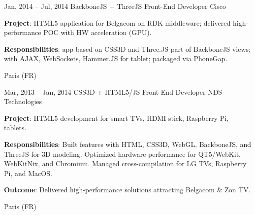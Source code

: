 \documentclass[
  a4paper,
   maincolor=cvblue,
   sectioncolor=cvblue,
   sidebarwidth=0.323\paperwidth,
]{fortysecondscv}
\begin{document}
\newpage
\makethirdsidebar

\vspace*{-1em} %
\begin{cvtableNew}
  \cvitemRightNew
    {Jan, 2014 – Jul, 2014} %
    {BackboneJS + ThreeJS Front-End Developer} %
    {Cisco} %
    {
      \vspace{1pt}
      \fontsize{10.8pt}{12pt}\selectfont %
      \textbf{Project}: HTML5 application for Belgacom on RDK middleware; delivered high-performance POC with HW acceleration (GPU).\par
      \vspace{4pt}
      \textbf{Responsibilities}: app based on CSS3D and Three.JS part of BackboneJS views; with AJAX, WebSockets, Hammer.JS for tablet; packaged via PhoneGap.\par
    }
    {Paris (FR)} %

  \vspace{1.2mm} %

  \cvitemRightNew
    {Mar, 2013 – Jan, 2014} %
    {CSS3D + HTML5/JS Front-End Developer} %
    {NDS Technologies} %
    {
      \vspace{1pt}
      \fontsize{10.8pt}{12pt}\selectfont %
      \textbf{Project}: HTML5 development for smart TVs, HDMI stick, Raspberry Pi, tablets.\par
      \vspace{4pt}
      \textbf{Responsibilities}: Built features with HTML, CSS3D, WebGL, BackboneJS, and ThreeJS for 3D modeling. Optimized hardware performance for QT5/WebKit, WebKitNix, and Chromium. Managed cross-compilation for LG TVs, Raspberry Pi, and MacOS.\par
      \vspace{4pt}
      \textbf{Outcome}: Delivered high-performance solutions attracting Belgacom \& Zon TV.\par
    }
    {Paris (FR)} %

  \vspace{1.48mm} %


\end{cvtableNew}
\end{document}
